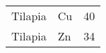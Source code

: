\begin{table}
\begin{threeparttable}
\begin{tabularx}{\textwidth}{XXX}
    Tilapia
    &Cu
    &\SI{40}{\p} \tnote{*}
    \\
    
    Tilapia
    &Zn
    &\SI{34}{\p} \tnote{*}
    \\
    
    \bottomrule

    \end{tabularx}
    \begin{tablenotes}
      \item[‡] \cite{Fry2018}
      \item[$] \cite{Morales2018}
      \item[*] \cite{Roy2022}
    \end{tablenotes}
  \end{threeparttable}
\end{table}
